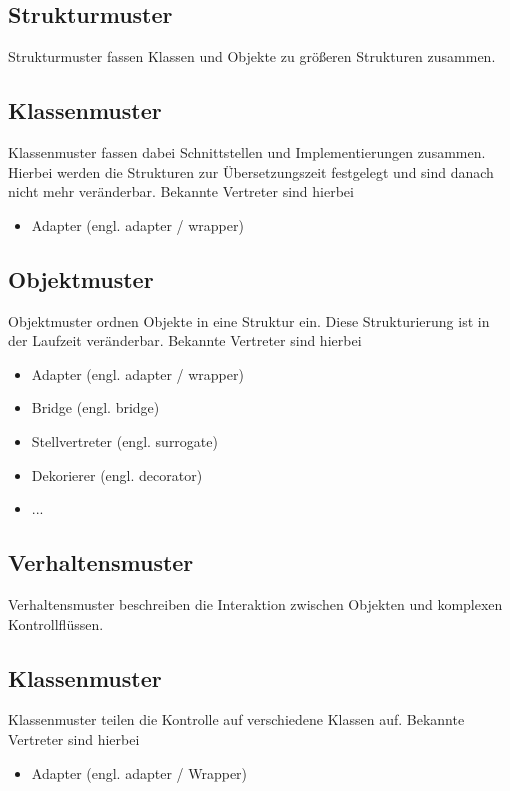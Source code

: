 		\subsection{Strukturmuster}
		Strukturmuster fassen Klassen und Objekte zu größeren Strukturen zusammen.
			
			\subsection{Klassenmuster}
			Klassenmuster fassen dabei Schnittstellen und Implementierungen zusammen. Hierbei werden die Strukturen zur Übersetzungszeit festgelegt und sind danach nicht mehr veränderbar. Bekannte Vertreter sind hierbei
			\begin{itemize}
				\item Adapter (engl. adapter / wrapper)
			\end{itemize}
			
			\subsection{Objektmuster}
			Objektmuster ordnen Objekte in eine Struktur ein. Diese Strukturierung ist in der Laufzeit veränderbar. Bekannte Vertreter sind hierbei
			\begin{itemize}
				\item Adapter (engl. adapter / wrapper)
				\item Bridge (engl. bridge)
				\item Stellvertreter (engl. surrogate)
				\item Dekorierer (engl. decorator)
				\item ...
			\end{itemize}
		
		\subsection{Verhaltensmuster}
		Verhaltensmuster beschreiben die Interaktion zwischen Objekten und komplexen Kontrollflüssen.
			\subsection{Klassenmuster}
			Klassenmuster teilen die Kontrolle auf verschiedene Klassen auf. Bekannte Vertreter sind hierbei
			\begin{itemize}
				\item Adapter (engl. adapter / Wrapper)
			\end{itemize}
			
